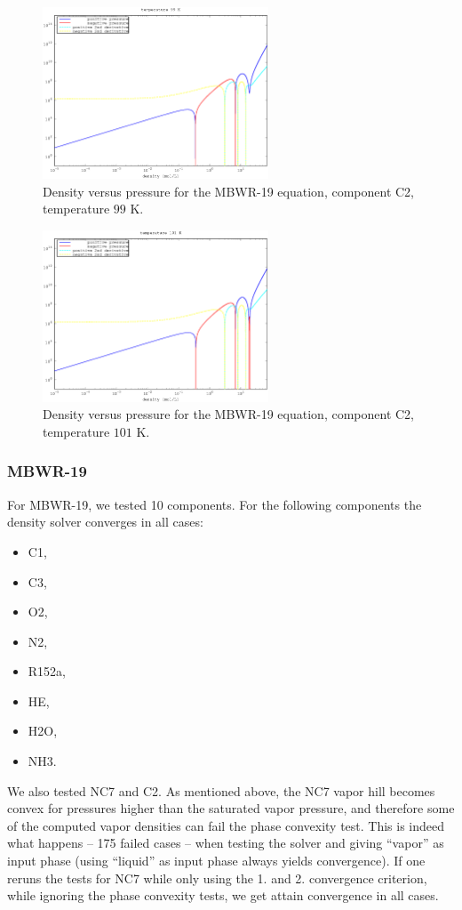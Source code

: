 \documentclass[english]{../thermomemo/thermomemo}
\numberwithin{equation}{section}
\begin{document}
\begin{figure}[h]
  \centering
  \includegraphics[width=0.6\textwidth]{figures/C2.eps}
  \caption{Density versus pressure for the MBWR-19 equation, component
    C2, temperature $99$ K.}
  \label{C2}
\end{figure}
\begin{figure}[h]
  \centering
  \includegraphics[width=0.6\textwidth]{figures/C2_101.eps}
  \caption{Density versus pressure for the MBWR-19 equation, component
    C2, temperature $101$ K.}
  \label{C2_101}
\end{figure}

\subsubsection*{MBWR-19}
For MBWR-19, we tested 10 components. For the following components the
density solver converges in all cases:
\begin{itemize}
\item C1,
\item C3,
\item O2,
\item N2,
\item R152a,
\item HE,
\item H2O,
\item NH3.
\end{itemize}
We also tested NC7 and C2. As mentioned above, the NC7 vapor hill becomes convex for
pressures higher than the saturated vapor pressure, and therefore some of the
computed vapor densities can fail the phase convexity test. This is
indeed what happens -- 175 failed cases -- when testing the solver and giving
``vapor'' as input phase (using ``liquid'' as input phase always
yields convergence). If one reruns the tests for NC7 while only using
the 1. and 2. convergence criterion, while ignoring the phase
convexity tests, we get attain convergence in all cases.
\end{document}
